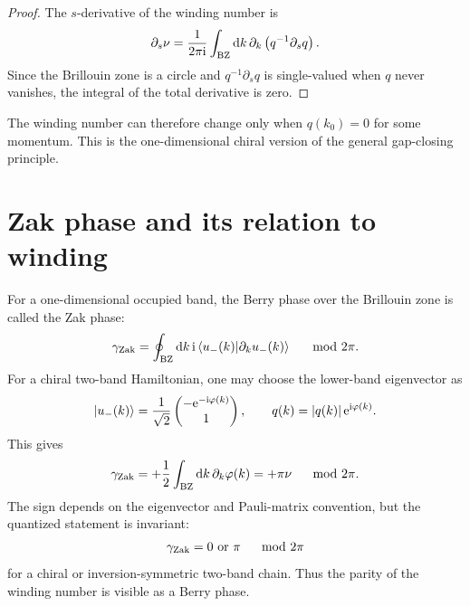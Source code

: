 \begin{proof}
The $s$-derivative of the winding number is
\begin{equation}
    \partial_s\nu
    =
    \frac{1}{2\pi\mathrm{i}}\int_{\rm BZ}\mathrm{d} k\,
    \partial_k\left(q^{-1}\partial_s q\right).
\end{equation}
Since the Brillouin zone is a circle and $q^{-1}\partial_s q$ is single-valued
when $q$ never vanishes, the integral of the total derivative is zero.
\end{proof}

The winding number can therefore change only when $q(k_0)=0$ for some momentum.
This is the one-dimensional chiral version of the general gap-closing principle.

\section{Zak phase and its relation to winding}
\label{sec:topo-zak-phase}

For a one-dimensional occupied band, the Berry phase over the Brillouin zone is
called the Zak phase:
\begin{equation}
\label{eq:topo-zak-phase-definition}
    \gamma_{\rm Zak}
    =
    \oint_{\rm BZ}\mathrm{d} k\,
    \mathrm{i}\left\langle u_-(k)\middle|\partial_k u_-(k)\right\rangle
    \quad\mod 2\pi .
\end{equation}
For a chiral two-band Hamiltonian, one may choose the lower-band eigenvector as
\begin{equation}
\label{eq:topo-chiral-eigenvector}
    \left|u_-(k)\right\rangle
    =
    \frac{1}{\sqrt{2}}
    \begin{pmatrix}
        -\mathrm{e}^{-\mathrm{i}\varphi(k)}\\
        1
    \end{pmatrix},
    \qquad
    q(k)=\left|q(k)\right|\mathrm{e}^{\mathrm{i}\varphi(k)}.
\end{equation}
This gives
\begin{equation}
\label{eq:topo-zak-winding-relation}
    \gamma_{\rm Zak}
    =
    +\frac12\int_{\rm BZ}\mathrm{d} k\,\partial_k\varphi(k)
    =
    +\pi\nu
    \quad\mod 2\pi .
\end{equation}
The sign depends on the eigenvector and Pauli-matrix convention, but the
quantized statement is invariant:
\begin{equation}
\label{eq:topo-zak-quantized-statement}
    \gamma_{\rm Zak}=0\ \text{or}\ \pi\quad\mod 2\pi
\end{equation}
for a chiral or inversion-symmetric two-band chain.  Thus the parity of the
winding number is visible as a Berry phase.

